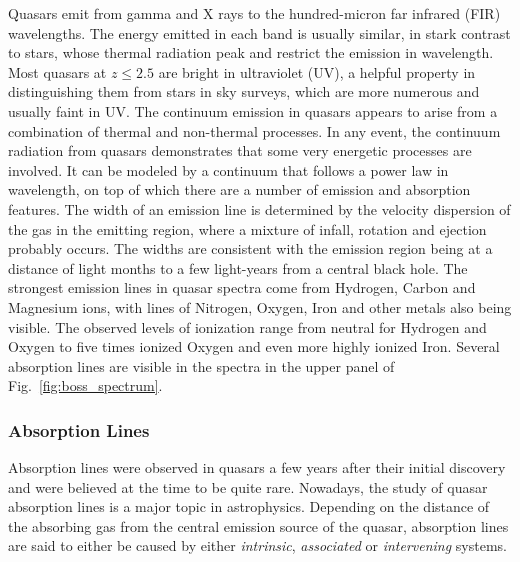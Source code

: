 Quasars emit from gamma and X rays to the hundred-micron far infrared (FIR) wavelengths. The energy emitted in each band is usually similar, in stark contrast to stars, whose thermal radiation peak and restrict the emission in wavelength. Most quasars at $z \leq 2.5$ are bright in ultraviolet (UV), a helpful property in distinguishing them from stars in sky surveys, which are more numerous and usually faint in UV. The continuum emission in quasars appears to arise from a combination of thermal and non-thermal processes. In any event, the continuum radiation from quasars demonstrates that some very energetic processes are involved. It can be modeled by a continuum that follows a power law in wavelength, on top of which there are a number of emission and absorption features. The width of an emission line is determined by the velocity dispersion of the gas in the emitting region, where a mixture of infall, rotation and ejection probably occurs. The widths
are consistent with the emission region being at a distance of light months to a few light-years from a central black hole. The strongest emission lines in quasar spectra come from Hydrogen, Carbon and Magnesium ions, with lines of Nitrogen, Oxygen, Iron and other metals also being visible. The observed levels of ionization range from neutral for Hydrogen and Oxygen to five
times ionized Oxygen and even more highly ionized Iron. Several absorption lines are visible in the spectra in the upper panel of Fig.~\ref{fig:boss_spectrum}.


\subsubsection{Absorption Lines}

Absorption lines were observed in quasars a few years after their initial discovery and were believed at the time to be quite rare. Nowadays, the
study of quasar absorption lines is a major topic in astrophysics. Depending on the distance of the absorbing gas from the central emission source of the quasar, absorption lines are said to either be caused by either \emph{intrinsic}, \emph{associated} or \emph{intervening} systems. \\


